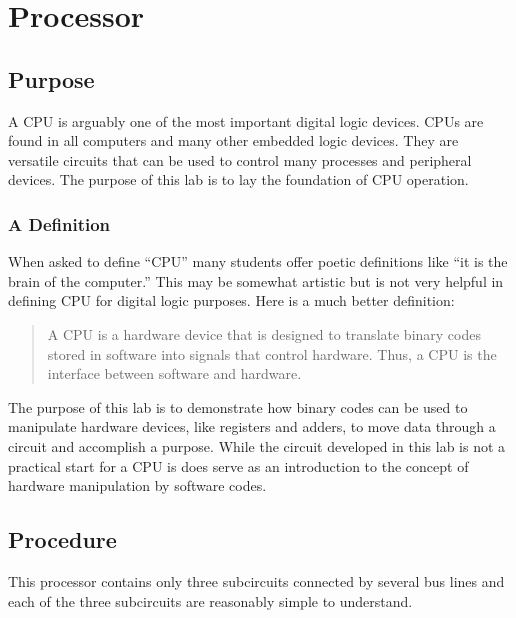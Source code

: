 \chapter{Processor}

\section{Purpose}

A \acf{CPU} is arguably one of the most important digital logic devices. \acp{CPU} are found in all computers and many other embedded logic devices. They are versatile circuits that can be used to control many processes and peripheral devices. The purpose of this lab is to lay the foundation of \ac{CPU} operation.

\subsection{A Definition} 

When asked to define ``\ac{CPU}'' many students offer poetic definitions like ``it is the brain of the computer.'' This may be somewhat artistic but is not very helpful in defining \ac{CPU} for digital logic purposes. Here is a much better definition:

\begin{quote}
	A \acf{CPU} is a hardware device that is designed to translate binary codes stored in software into signals that control hardware. Thus, a \ac{CPU} is the interface between software and hardware.
\end{quote}

The purpose of this lab is to demonstrate how binary codes can be used to manipulate hardware devices, like registers and adders, to move data through a circuit and accomplish a purpose. While the circuit developed in this lab is not a practical start for a \ac{CPU} is does serve as an introduction to the concept of hardware manipulation by software codes. 

\section{Procedure}

This processor contains only three subcircuits connected by several bus lines and each of the three subcircuits are reasonably simple to understand.


